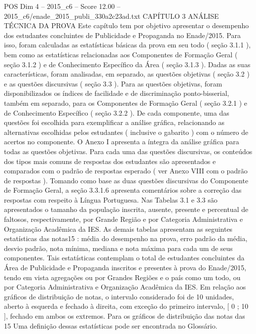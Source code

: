 \begin{textsample}{POS Dim 4 – 2015\_c6 – Score 12.00 – 2015\_c6/enade\_2015\_publi\_330a2c23ad.txt}  \label{ex:f4_pos_030}
CAPÍTULO 3 ANÁLISE TÉCNICA DA PROVA Este capítulo tem por objetivo apresentar o desempenho dos estudantes concluintes de Publicidade e Propaganda no Enade/2015.
Para isso, foram calculadas as estatísticas básicas da prova em seu todo ( seção 3.1.1 ), bem como as estatísticas relacionadas aos Componentes de Formação Geral ( seção 3.1.2 ) e de Conhecimento Específico da Área ( seção 3.1.3 ).
Dadas as suas características, foram analisadas, em separado, as questões objetivas ( seção 3.2 ) e as questões discursivas ( seção 3.3 ).
Para as questões objetivas, foram disponibilizados os índices de facilidade e de discriminação ponto-bisserial, também em separado, para os Componentes de Formação Geral ( seção 3.2.1 ) e de Conhecimento Específico ( seção 3.2.2 ).
De cada componente, uma das questões foi escolhida para exemplificar a análise gráfica, relacionando as alternativas escolhidas pelos estudantes ( inclusive o gabarito ) com o número de acertos no componente.
O Anexo I apresenta a íntegra da análise gráfica para todas as questões objetivas.
Para cada uma das questões discursivas, os conteúdos dos tipos mais comuns de respostas dos estudantes são apresentados e comparados com o padrão de respostas esperado ( ver Anexo VIII com o padrão de respostas ).
Tomando como base as duas questões discursivas do Componente de Formação Geral, a seção 3.3.1.6 apresenta comentários sobre a correção das respostas com respeito à Língua Portuguesa.
Nas Tabelas 3.1 e 3.3 são apresentados o tamanho da população inscrita, ausente, presente e percentual de faltosos, respectivamente, por Grande Região e por Categoria Administrativa e Organização Acadêmica da IES.
As demais tabelas apresentam as seguintes estatísticas das notas15 : média do desempenho na prova, erro padrão da média, desvio padrão, nota mínima, mediana e nota máxima para cada um de seus componentes.
Tais estatísticas contemplam o total de estudantes concluintes da Área de Publicidade e Propaganda inscritos e presentes à prova do Enade/2015, tendo em vista agregações ou por Grandes Regiões e o país como um todo, ou por Categoria Administrativa e Organização Acadêmica da IES.
Em relação aos gráficos de distribuição de notas, o intervalo considerado foi de 10 unidades, aberto à esquerda e fechado à direita, com exceção do primeiro intervalo, [ 0 ; 10 ], fechado em ambos os extremos.
Para os gráficos de distribuição das notas das 15 Uma definição dessas estatísticas pode ser encontrada no Glossário.

\end{textsample}
